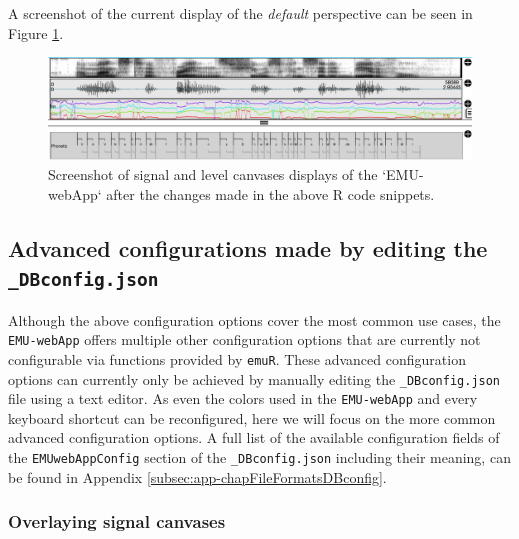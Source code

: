 \documentclass[]{book}
\begin{document}
A screenshot of the current display of the \emph{default} perspective can be seen in Figure \ref{fig:webApp-postOderChange}.

\begin{figure}

{\centering \includegraphics[width=1\linewidth]{pics/emu-webAppPostOderChange} 

}

\caption{Screenshot of signal and level canvases displays of the `EMU-webApp` after the changes made in the above R code snippets.}\label{fig:webApp-postOderChange}
\end{figure}

\hypertarget{subsec:emu-webAppAdvancedConfig}{%
\subsection{\texorpdfstring{Advanced configurations made by editing the \texttt{\_DBconfig.json}}{Advanced configurations made by editing the \_DBconfig.json}}\label{subsec:emu-webAppAdvancedConfig}}

Although the above configuration options cover the most common use cases, the \texttt{EMU-webApp} offers multiple other configuration options that are currently not configurable via functions provided by \texttt{emuR}. These advanced configuration options can currently only be achieved by manually editing the \texttt{\_DBconfig.json} file using a text editor. As even the colors used in the \texttt{EMU-webApp} and every keyboard shortcut can be reconfigured, here we will focus on the more common advanced configuration options. A full list of the available configuration fields of the \texttt{EMUwebAppConfig} section of the \texttt{\_DBconfig.json} including their meaning, can be found in Appendix \ref{subsec:app-chapFileFormatsDBconfig}.

\hypertarget{overlaying-signal-canvases}{%
\subsubsection{Overlaying signal canvases}\label{overlaying-signal-canvases}}
\end{document}
